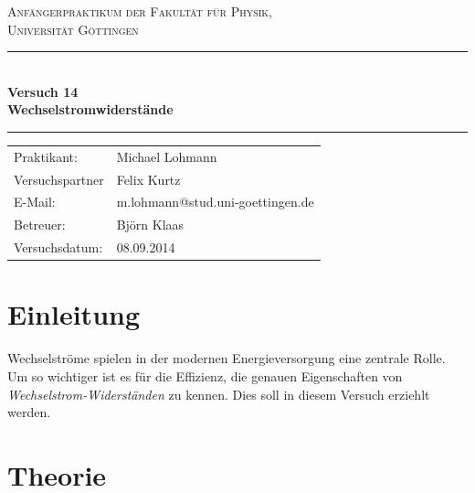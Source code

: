 \documentclass[12pt,a4paper,titlepage,headinclude,bibtotoc]{scrartcl}
\begin{document}
\begin{titlepage}
\centering
\textsc{\Large Anfängerpraktikum der Fakultät für
  Physik,\\[1.5ex] Universität Göttingen}

\vspace*{4.2cm}

\rule{\textwidth}{1pt}\\[0.5cm]
{\huge \bfseries
Versuch 14\\[1.5ex]
  Wechselstromwiderstände
  }\\[0.5cm]
\rule{\textwidth}{1pt}

\vspace*{2.5cm}

\begin{Large}
\begin{tabular}{ll}
Praktikant: &  Michael Lohmann\\
 Versuchspartner &  Felix Kurtz\\
 E-Mail: & m.lohmann@stud.uni-goettingen.de\\
 Betreuer: & Björn Klaas\\
 Versuchsdatum: & 08.09.2014\\
\end{tabular}
\end{Large}

\vspace*{0.8cm}

\begin{Large}
\end{Large}

\end{titlepage}

\tableofcontents

\newpage

\section{Einleitung}
\label{sec:einleitung}
Wechselströme spielen in der modernen Energieversorgung eine zentrale Rolle.
Um so wichtiger ist es für die Effizienz, die genauen Eigenschaften von \emph{Wechselstrom-Widerständen} zu kennen.
Dies soll in diesem Versuch erziehlt werden.
\section{Theorie}
\label{sec:theorie}
\end{document}
